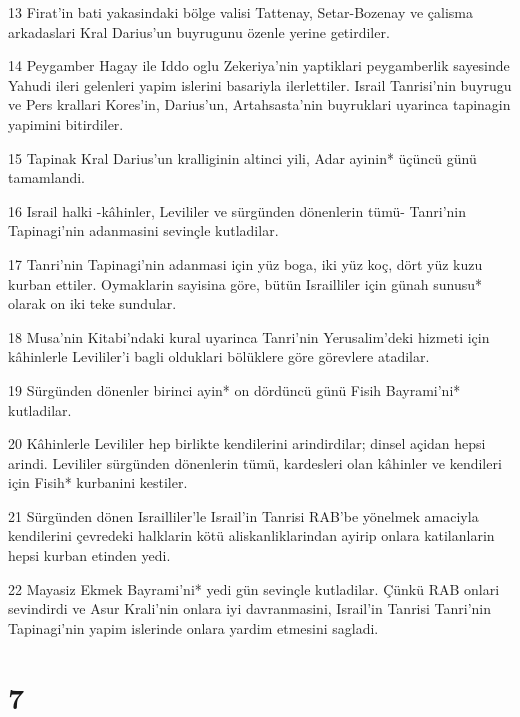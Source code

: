 \par 13 Firat'in bati yakasindaki bölge valisi Tattenay, Setar-Bozenay ve çalisma arkadaslari Kral Darius'un buyrugunu özenle yerine getirdiler.
\par 14 Peygamber Hagay ile Iddo oglu Zekeriya'nin yaptiklari peygamberlik sayesinde Yahudi ileri gelenleri yapim islerini basariyla ilerlettiler. Israil Tanrisi'nin buyrugu ve Pers krallari Kores'in, Darius'un, Artahsasta'nin buyruklari uyarinca tapinagin yapimini bitirdiler.
\par 15 Tapinak Kral Darius'un kralliginin altinci yili, Adar ayinin* üçüncü günü tamamlandi.
\par 16 Israil halki -kâhinler, Levililer ve sürgünden dönenlerin tümü- Tanri'nin Tapinagi'nin adanmasini sevinçle kutladilar.
\par 17 Tanri'nin Tapinagi'nin adanmasi için yüz boga, iki yüz koç, dört yüz kuzu kurban ettiler. Oymaklarin sayisina göre, bütün Israilliler için günah sunusu* olarak on iki teke sundular.
\par 18 Musa'nin Kitabi'ndaki kural uyarinca Tanri'nin Yerusalim'deki hizmeti için kâhinlerle Levililer'i bagli olduklari bölüklere göre görevlere atadilar.
\par 19 Sürgünden dönenler birinci ayin* on dördüncü günü Fisih Bayrami'ni* kutladilar.
\par 20 Kâhinlerle Levililer hep birlikte kendilerini arindirdilar; dinsel açidan hepsi arindi. Levililer sürgünden dönenlerin tümü, kardesleri olan kâhinler ve kendileri için Fisih* kurbanini kestiler.
\par 21 Sürgünden dönen Israilliler'le Israil'in Tanrisi RAB'be yönelmek amaciyla kendilerini çevredeki halklarin kötü aliskanliklarindan ayirip onlara katilanlarin hepsi kurban etinden yedi.
\par 22 Mayasiz Ekmek Bayrami'ni* yedi gün sevinçle kutladilar. Çünkü RAB onlari sevindirdi ve Asur Krali'nin onlara iyi davranmasini, Israil'in Tanrisi Tanri'nin Tapinagi'nin yapim islerinde onlara yardim etmesini sagladi.

\chapter{7}

